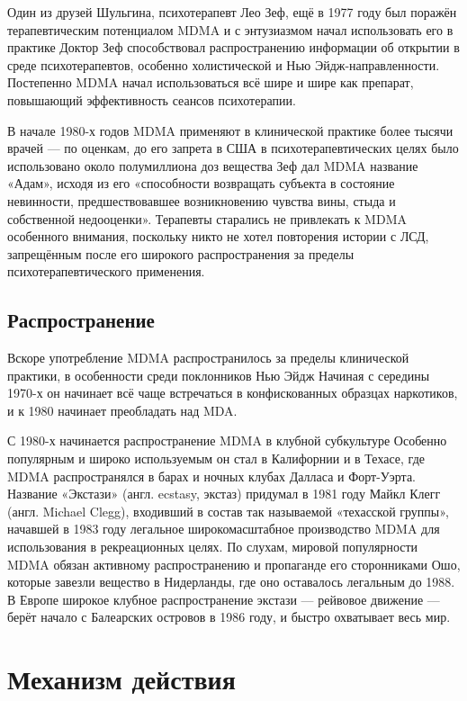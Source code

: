 \documentclass[a4paper,14pt,russian]{report}
\begin{document}
Один из друзей Шульгина, психотерапевт Лео Зеф, ещё в 1977 году был поражён терапевтическим потенциалом MDMA и с энтузиазмом начал использовать его в практике Доктор Зеф способствовал распространению информации об открытии в среде психотерапевтов, особенно холистической и Нью Эйдж-направленности. Постепенно MDMA начал использоваться всё шире и шире как препарат, повышающий эффективность сеансов психотерапии.

В начале 1980-х годов MDMA применяют в клинической практике более тысячи врачей — по оценкам, до его запрета в США в психотерапевтических целях было использовано около полумиллиона доз вещества Зеф дал MDMA название «Адам», исходя из его «способности возвращать субъекта в состояние невинности, предшествовавшее возникновению чувства вины, стыда и собственной недооценки». Терапевты старались не привлекать к MDMA особенного внимания, поскольку никто не хотел повторения истории с ЛСД, запрещённым после его широкого распространения за пределы психотерапевтического применения.

\subsection{Распространение}

Вскоре употребление MDMA распространилось за пределы клинической практики, в особенности среди поклонников Нью Эйдж Начиная с середины 1970-х он начинает всё чаще встречаться в конфискованных образцах наркотиков, и к 1980 начинает преобладать над MDA.

С 1980-х начинается распространение MDMA в клубной субкультуре Особенно популярным и широко используемым он стал в Калифорнии и в Техасе, где MDMA распространялся в барах и ночных клубах Далласа и Форт-Уэрта. Название «Экстази» (англ. ecstasy, экстаз) придумал в 1981 году Майкл Клегг (англ. Michael Clegg), входивший в состав так называемой «техасской группы», начавшей в 1983 году легальное широкомасштабное производство MDMA для использования в рекреационных целях. По слухам, мировой популярности MDMA обязан активному распространению и пропаганде его сторонниками Ошо, которые завезли вещество в Нидерланды, где оно оставалось легальным до 1988. В Европе широкое клубное распространение экстази — рейвовое движение — берёт начало с Балеарских островов в 1986 году, и быстро охватывает весь мир.


\section{Механизм действия}
\end{document}
